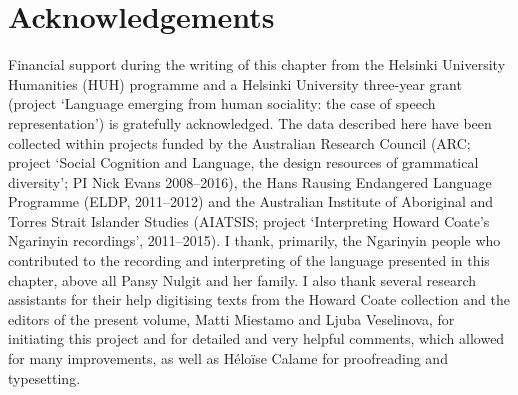 \documentclass[output=paper,colorlinks,citecolor=brown]{langscibook}
\begin{document}
\section*{Acknowledgements}
Financial support during the writing of this chapter from the Helsinki University Humanities (HUH) programme and a Helsinki University three-year grant (project `Language emerging from human sociality: the case of speech representation') is gratefully acknowledged. The data described here have been collected within projects funded by the Australian Research Council (ARC; project `Social Cognition and Language, the design resources of grammatical diversity'; PI Nick Evans 2008--2016), the  Hans Rausing Endangered Language Programme (ELDP, 2011--2012) and the Australian Institute of Aboriginal and Torres Strait Islander Studies (AIATSIS; project `Interpreting Howard Coate's Ngarinyin recordings', 2011--2015). I thank, primarily, the Ngarinyin people who contributed to the recording and interpreting of the language presented in this chapter, above all Pansy Nulgit and her family. I also thank several research assistants for their help digitising texts from the Howard Coate collection \citep{Coate1930-1971} and the editors of the present volume, Matti Miestamo and Ljuba Veselinova, for initiating this project and for detailed and very helpful comments, which allowed for many improvements, as well as Héloïse Calame for proofreading and typesetting.
\end{document}

